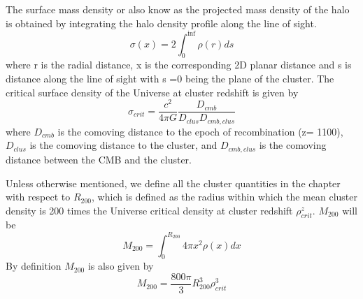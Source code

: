 The surface mass density or also know as the projected mass density of the halo is obtained by integrating the halo density profile along the line of sight. 
 \begin{equation}
 \sigma(x) = 2 \int^{\inf}_{0} \rho(r) ds
 \label{eq:surface_density}
 \end{equation}
 where r is the radial distance, x is the corresponding 2D planar distance and s is distance along the line of sight with s =0 being the plane of the cluster.
 The critical surface density of the Universe at cluster redshift is given by
 \begin{equation}
 \sigma_{crit} = \frac{c^{2}}{4\pi G} \frac{D_{cmb}}{D_{clus}D_{cmb,clus}}
 \end{equation}
 where $D_{cmb}$ is the comoving distance to the epoch of recombination (z= 1100), $D_{clus}$ is the comoving distance to the cluster, and $D_{cmb,clus}$ is the comoving distance between the CMB and the cluster.
 
 Unless otherwise mentioned, we define all the cluster quantities in the chapter with respect to $R_{200}$, which is defined as the radius within which the mean cluster density is 200 times the Universe critical density at cluster redshift $\rho^{z}_{crit}$. $M_{200}$ will be 
 \begin{equation}
 M_{200} = \int^{R_{200}}_{0}  4\pi x^{2} \rho(x) dx
 \end{equation}
 By definition $M_{200}$ is also given by
 \begin{equation}
 M_{200} = \frac{800\pi}{3} R^{3}_{200} \rho^{3}_{crit}
 \end{equation}
 
